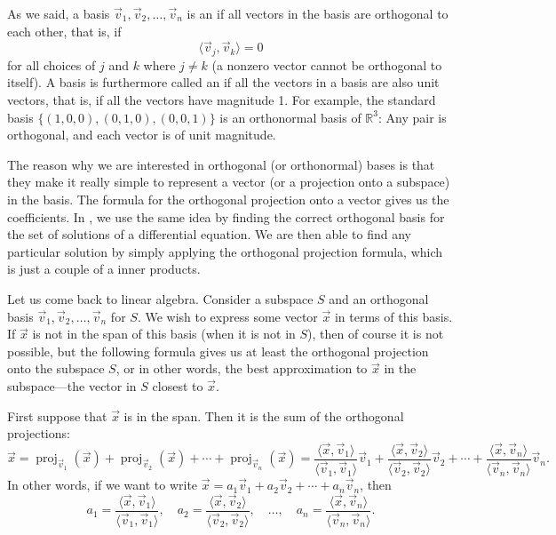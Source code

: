 As we said, a basis $\vec{v}_1,\vec{v}_2,\ldots,\vec{v}_n$
is an \emph{} if all vectors in the
basis are orthogonal to each other, that is, if
\begin{equation*}
\langle \vec{v}_j , \vec{v}_k \rangle = 0
\end{equation*}
for all choices of $j$ and $k$ where $j \not= k$ (a nonzero vector cannot be
orthogonal to itself).
A basis is furthermore called an \emph{} if all
the vectors in a basis are also unit vectors, that is, if all the vectors
have magnitude 1.
For example, the standard basis $\{ (1,0,0), (0,1,0), (0,0,1) \}$ is an
orthonormal basis of ${\mathbb{R}}^3$:
Any pair is orthogonal, and each vector is of unit
magnitude.

The reason why we are interested in orthogonal (or orthonormal) bases is
that they make it really simple to represent a vector (or a projection onto
a subspace) in the basis.  The formula for the orthogonal projection
onto a vector gives us the coefficients.  In 
, we use the same idea by finding the correct 
orthogonal basis for the set of solutions of a differential equation.
We are then able to find any particular solution by simply applying the
orthogonal projection formula, which is just a couple of a inner products.

Let us come back to linear algebra.  Consider a subspace $S$
and an orthogonal
basis $\vec{v}_1, \vec{v}_2, \ldots, \vec{v}_n$ for $S$.
We wish to
express some vector $\vec{x}$ in terms of this basis.
If $\vec{x}$ is not in the span
of this basis (when it is not in $S$),
then of course it is not possible,
but the following formula
gives us at least the orthogonal projection onto the subspace $S$,
or in other words, the best approximation
to $\vec{x}$ in the subspace---the vector in $S$ closest to $\vec{x}$.

First suppose that $\vec{x}$ is in the span.  Then it is the sum of the
orthogonal projections:
\begin{equation*}
\vec{x} = 
\operatorname{proj}_{\vec{v}_1} ( \vec{x} )
+
\operatorname{proj}_{\vec{v}_2} ( \vec{x} )
+
\cdots
+
\operatorname{proj}_{\vec{v}_n} ( \vec{x} )
=
\frac{\langle \vec{x}, \vec{v}_1 \rangle}{
\langle \vec{v}_1, \vec{v}_1 \rangle
}
\vec{v}_1
+
\frac{\langle \vec{x}, \vec{v}_2 \rangle}{
\langle \vec{v}_2, \vec{v}_2 \rangle
}
\vec{v}_2
+
\cdots
+
\frac{\langle \vec{x}, \vec{v}_n \rangle}{
\langle \vec{v}_n, \vec{v}_n \rangle
}
\vec{v}_n .
\end{equation*}
In other words, if we want to write
$\vec{x} =
a_1 \vec{v}_1 + 
a_2 \vec{v}_2 + \cdots +
a_n \vec{v}_n$, then
\begin{equation*}
a_1 = 
\frac{\langle \vec{x}, \vec{v}_1 \rangle}{
\langle \vec{v}_1, \vec{v}_1 \rangle
} , \quad
a_2 = 
\frac{\langle \vec{x}, \vec{v}_2 \rangle}{
\langle \vec{v}_2, \vec{v}_2 \rangle
} , \quad \ldots , \quad
a_n = 
\frac{\langle \vec{x}, \vec{v}_n \rangle}{
\langle \vec{v}_n, \vec{v}_n \rangle
} .
\end{equation*}

